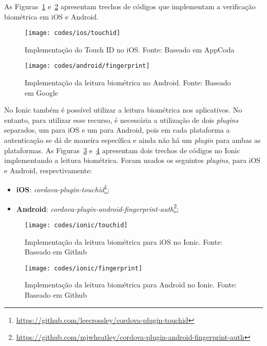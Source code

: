 As Figuras~\ref{fig:touchid-ios} e~\ref{fig:fingerprint-android} apresentam trechos de códigos que implementam a verificação biométrica em iOS e Android.

\begin{figure}[H]
	\centering
	\texttt{[image: codes/ios/touchid]}
	\caption[Implementação do Touch ID no iOS]{Implementação do Touch ID no iOS. Fonte: Baseado em AppCoda\protect\footnotemark}
	\label{fig:touchid-ios}
\end{figure}
\begin{figure}[H]
	\centering
	\texttt{[image: codes/android/fingerprint]}
	\caption[Implementação da leitura biométrica no Android]{Implementação da leitura biométrica no Android. Fonte: Baseado em Google\protect\footnotemark}
	\label{fig:fingerprint-android}
\end{figure}

No Ionic também é possível utilizar a leitura biométrica nos aplicativos. No entanto, para utilizar esse recurso, é necessária a utilização de dois \textit{plugins} separados, um para iOS e um para Android, pois em 
cada plataforma a autenticação se dá de maneira específica e ainda não há um \textit{plugin} para ambas as plataformas. As Figuras~\ref{fig:finger-ios-ionic} e~\ref{fig:finger-android-ionic} apresentam dois trechos de 
códigos no Ionic implementando a leitura biométrica. Foram usados os seguintes \textit{plugins}, para iOS e Android, respectivamente:
\begin{itemize}
	\item \textbf{iOS}: \textit{cordova-plugin-touchid}\footnote{\url{https://github.com/leecrossley/cordova-plugin-touchid}};
	\item \textbf{Android}: \textit{cordova-plugin-android-fingerprint-auth}\footnote{\url{https://github.com/mjwheatley/cordova-plugin-android-fingerprint-auth}}; 
\end{itemize}
\begin{figure}[H]
	\centering
	\texttt{[image: codes/ionic/touchid]}
	\caption[Implementação da leitura biométrica para iOS no Ionic]{Implementação da leitura biométrica para iOS no Ionic. Fonte: Baseado em Github\protect\footnotemark}
	\label{fig:finger-ios-ionic}
\end{figure}
\begin{figure}[H]
	\centering
	\texttt{[image: codes/ionic/fingerprint]}
	\caption[Implementação da leitura biométrica para Android no Ionic]{Implementação da leitura biométrica para Android no Ionic. Fonte: Baseado em Github\protect\footnotemark}
	\label{fig:finger-android-ionic}
\end{figure}

